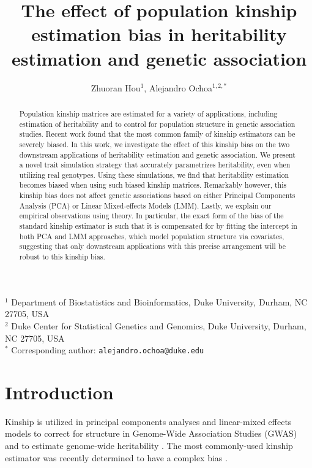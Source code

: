 \documentclass[11pt]{article}
\title{\Large \textbf{The effect of population kinship estimation bias in heritability estimation and genetic association}}
\author{Zhuoran Hou$^1$, Alejandro Ochoa$^{1,2,*}$}
\date{}
\begin{document}
\maketitle

\noindent
$^1$ Department of Biostatistics and Bioinformatics, Duke University, Durham, NC 27705, USA \\
$^2$ Duke Center for Statistical Genetics and Genomics, Duke University, Durham, NC 27705, USA \\
$^*$ Corresponding author: \texttt{alejandro.ochoa@duke.edu}


\begin{abstract}
  Population kinship matrices are estimated for a variety of applications, including estimation of heritability and to control for population structure in genetic association studies.
  Recent work found that the most common family of kinship estimators can be severely biased.
  In this work, we investigate the effect of this kinship bias on the two downstream applications of heritability estimation and genetic association.
  We present a novel trait simulation strategy that accurately parametrizes heritability, even when utilizing real genotypes.
  Using these simulations, we find that heritability estimation becomes biased when using such biased kinship matrices.
  Remarkably however, this kinship bias does not affect genetic associations based on either Principal Components Analysis (PCA) or Linear Mixed-effects Models (LMM).
  Lastly, we explain our empirical observations using theory.
  In particular, the exact form of the bias of the standard kinship estimator is such that it is compensated for by fitting the intercept in both PCA and LMM approaches, which model population structure via covariates, suggesting that only downstream applications with this precise arrangement will be robust to this kinship bias.
\end{abstract}



\clearpage
	
\section{Introduction}

Kinship is utilized in principal components analyses and linear-mixed effects models to correct for structure in Genome-Wide Association Studies (GWAS) \citep{xie_combining_1998,yu_unified_2006, aulchenko_genomewide_2007, price_principal_2006, astle_population_2009,kang_efficient_2008, kang_variance_2010, zhou_genome-wide_2012, loh_efficient_2015, sul_population_2018} and to estimate genome-wide heritability \citep{yang_common_2010, yang_gcta:_2011, speed_improved_2012}.
The most commonly-used kinship estimator \citep{price_principal_2006, astle_population_2009, rakovski_kinship-based_2009, thornton_roadtrips:_2010, yang_common_2010, yang_gcta:_2011, zhou_genome-wide_2012, speed_improved_2012, speed_relatedness_2015, loh_efficient_2015, wang_efficient_2017, sul_population_2018} was recently determined to have a complex bias \citep{ochoa_estimating_2021, weir_unified_2017}.
\end{document}
